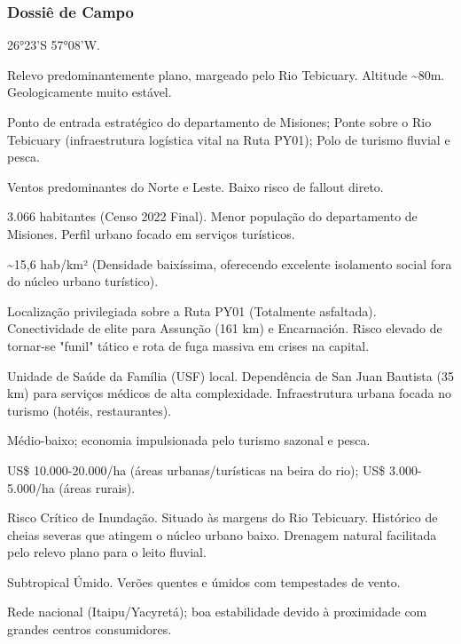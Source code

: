 \subsubsection{Dossiê de Campo}
\begin{description}[style=nextline,leftmargin=0.5cm,font=\bfseries]
\item[Coordenadas]  26°23'S 57°08'W.
\item[Topografia]  Relevo predominantemente plano, margeado pelo Rio Tebicuary. Altitude \textasciitilde 80m. Geologicamente muito estável.
\item[Alvos Estratégicos]  Ponto de entrada estratégico do departamento de Misiones; Ponte sobre o Rio Tebicuary (infraestrutura logística vital na Ruta PY01); Polo de turismo fluvial e pesca.
\item[Fallout]  Ventos predominantes do Norte e Leste. Baixo risco de fallout direto.
\item[População]  3.066 habitantes (Censo 2022 Final). Menor população do departamento de Misiones. Perfil urbano focado em serviços turísticos.
\item[Densidade]  \textasciitilde 15,6 hab/\allowbreak km² (Densidade baixíssima, oferecendo excelente isolamento social fora do núcleo urbano turístico).
\item[Vias de Acesso]  Localização privilegiada sobre a Ruta PY01 (Totalmente asfaltada). Conectividade de elite para Assunção (161 km) e Encarnación. Risco elevado de tornar-se "funil" tático e rota de fuga massiva em crises na capital.
\item[Serviços]  Unidade de Saúde da Família (USF) local. Dependência de San Juan Bautista (35 km) para serviços médicos de alta complexidade. Infraestrutura urbana focada no turismo (hotéis, restaurantes).
\item[Custo de Vida]  Médio-baixo; economia impulsionada pelo turismo sazonal e pesca.
\item[Preço da Terra]  US\$ 10.000-20.000/\allowbreak ha (áreas urbanas/\allowbreak turísticas na beira do rio); US\$ 3.000-5.000/\allowbreak ha (áreas rurais).
\item[Hidrologia]  Risco Crítico de Inundação. Situado às margens do Rio Tebicuary. Histórico de cheias severas que atingem o núcleo urbano baixo. Drenagem natural facilitada pelo relevo plano para o leito fluvial.
\item[Clima]  Subtropical Úmido. Verões quentes e úmidos com tempestades de vento.
\item[Energia]  Rede nacional (Itaipu/\allowbreak Yacyretá); boa estabilidade devido à proximidade com grandes centros consumidores.

\end{description}
